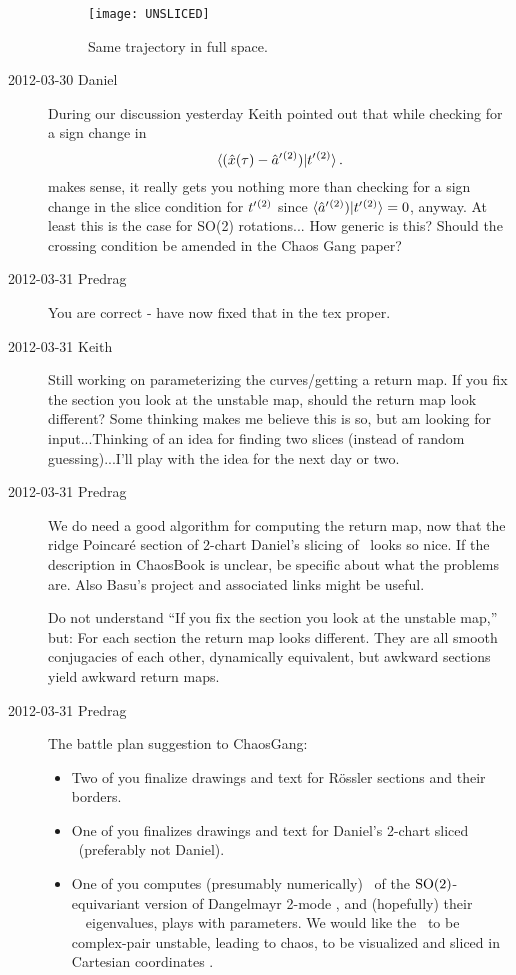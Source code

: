 \begin{description}
\begin{figure}
\begin{center}
  \texttt{[image: UNSLICED]}
\end{center}
  \caption{
  Same trajectory in full space.}
\label{fig:unsliced}
\end{figure}


\item[2012-03-30 Daniel]
During our discussion yesterday Keith pointed out that while checking for
a sign change in
\[
\braket{(\sspRed(\zeit)- \slicep{}^{(2)})}{\sliceTan{}{}^{(2)}}
\,.
\]
makes sense, it really gets you nothing more than checking for a sign
change in the slice condition for $t'_{}{}^{(2)}$ since
$\braket{\slicep{}^{(2)})}{\sliceTan{}{}^{(2)}} = 0$, anyway. At least
this is the case for SO(2) rotations... How generic is this? Should the
crossing condition be amended in the Chaos Gang paper?

\item[2012-03-31 Predrag] You are correct - have now fixed that in the
tex proper.

\item[2012-03-31 Keith] Still working on parameterizing the
curves/getting a return map.  If you fix the section you look at the
unstable map, should the return map look different?  Some thinking makes
me believe this is so, but am looking for input...Thinking of an idea for
finding two slices (instead of random guessing)...I'll play with the idea
for the next day or two.

\item[2012-03-31 Predrag] We do need a good algorithm for computing the
return map, now that the ridge Poincar\'e section of 2-chart Daniel's
slicing of \cLe\ looks so nice. If the description in ChaosBook is
unclear, be specific about what the problems are. Also
{Basu's project} and associated links might be useful.

Do not understand ``If you fix the section you look at the unstable
map,'' but: For each section the return map looks different. They are all
smooth conjugacies of each other, dynamically equivalent, but awkward
sections yield awkward return maps.

\item[2012-03-31 Predrag] The battle plan suggestion to ChaosGang:
\begin{itemize}
  \item
        Two of you finalize drawings and text for R\"ossler sections and
        their borders.
  \item
        One of you finalizes drawings and text for Daniel's 2-chart
        sliced \cLe\ (preferably not Daniel).
  \item
        One of you computes (presumably numerically) \reqva\ of the
        $\textrm{SO}(2)$-equivariant version of Dangelmayr 2-mode
        , and (hopefully) their \stabmat\ \Mvar\
        eigenvalues, plays with parameters. We would like the \reqva\ to
        be complex-pair unstable, leading to chaos, to be visualized and
        sliced in Cartesian coordinates \refeq{eq:AGH}.
\end{itemize}


\end{description}

